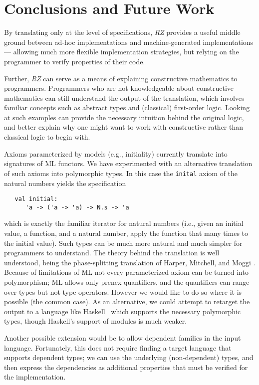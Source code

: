 \section{Conclusions and Future Work}
\label{sec:conclusion}

By translating only at the level of specifications, \emph{RZ} provides a
useful middle ground between ad-hoc implementations and
machine-generated implementations --- allowing much more flexible
implementation strategies, but relying on the programmer to
verify properties of their code.

Further, \emph{RZ} can serve as a means of explaining constructive
mathematics to programmers.  Programmers who are not knowledgeable
about constructive mathematics can still understand the output of the
translation, which involves familiar concepts such as abstract types
and (classical) first-order logic.   Looking at such examples can
provide the necessary intuition behind the original logic, and better
explain why one might want to work with constructive rather than
classical logic to begin with.

\bigskip
 
Axioms parameterized by models (e.g., initiality) currently translate
into signatures of ML functors.  We have experimented with an
alternative translation of such axioms into polymorphic types.  In
this case the \Verb|inital| axiom of the natural numbers yields
the specification
\begin{Verbatim}
   val initial: 
      'a -> ('a -> 'a) -> N.s -> 'a
\end{Verbatim}
which is exactly the familiar iterator for natural numbers (i.e.,
given an initial value, a function, and a natural number, apply the
function that many times to the initial value).  Such types can be
much more natural and much simpler for programmers to understand.  The
theory behind the translation is well understood, being the
phase-splitting translation of Harper, Mitchell, and Moggi
\cite{harper+:popl90}.  Because of limitations of ML not every
parameterized axiom can be turned into polymorphism; ML allows only
prenex quantifiers, and the quantifiers can range over types but not
type operators.  However we would like to do so where it is possible
(the common case).  As an alternative, we could attempt to retarget
the output to a language like Haskell~\cite{haskell} which supports
the necessary polymorphic types, though Haskell's support of modules
is much weaker.

Another possible extension would be to allow dependent families in the
input language. Fortunately, this does not require finding a target
language that supports dependent types; we can use the underlying
(non-dependent) types, and then express the dependencies as additional
properties that must be verified for the implementation.


